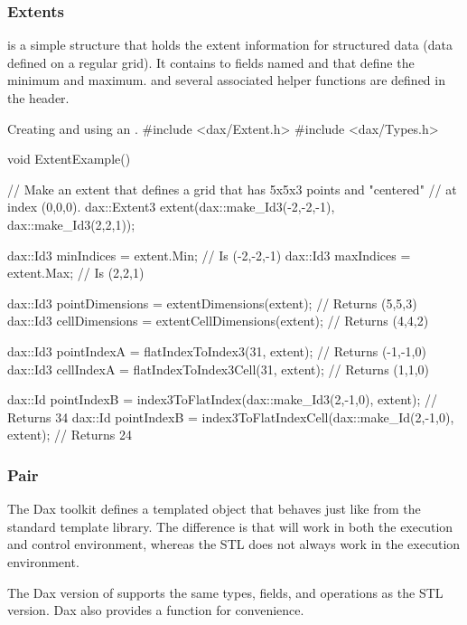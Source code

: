 \subsubsection{Extents}

 is a simple structure that holds the extent information for
structured data (data defined on a regular grid). It contains to 
fields named  and  that define the minimum and
maximum.  and several associated helper functions are defined
in the  header.

\begin{daxexample}{Creating and using an .}
#include <dax/Extent.h>
#include <dax/Types.h>

void ExtentExample()
{
  // Make an extent that defines a grid that has 5x5x3 points and "centered"
  // at index (0,0,0).
  dax::Extent3 extent(dax::make_Id3(-2,-2,-1), dax::make_Id3(2,2,1));

  dax::Id3 minIndices = extent.Min; // Is (-2,-2,-1)
  dax::Id3 maxIndices = extent.Max; // Is (2,2,1)

  dax::Id3 pointDimensions = extentDimensions(extent); // Returns (5,5,3)
  dax::Id3 cellDimensions = extentCellDimensions(extent); // Returns (4,4,2)

  dax::Id3 pointIndexA = flatIndexToIndex3(31, extent); // Returns (-1,-1,0)
  dax::Id3 cellIndexA = flatIndexToIndex3Cell(31, extent); // Returns (1,1,0)

  dax::Id pointIndexB = index3ToFlatIndex(dax::make_Id3(2,-1,0), extent); // Returns 34
  dax::Id pointIndexB = index3ToFlatIndexCell(dax::make_Id(2,-1,0), extent); // Returns 24
}
\end{daxexample}

\subsubsection{Pair}

The Dax toolkit defines a  templated object that
behaves just like  from the standard template
library. The difference is that  will work in both the execution
and control environment, whereas the STL  does not
always work in the execution environment.

The Dax version of  supports the same types, fields, and
operations as the STL version. Dax also provides a 
function for convenience.


